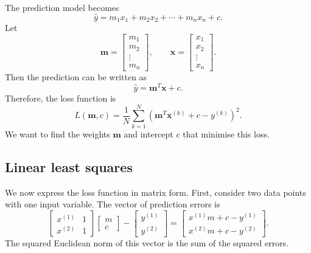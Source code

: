 The prediction model becomes
\[
	\hat{y}=m_1x_1+m_2x_2+\cdots+m_nx_n+c.
\]
Let
\[
	\mathbf{m}=
	\begin{bmatrix}
		m_1 \\m_2\\\vdots\\m_n
	\end{bmatrix},
	\qquad
	\mathbf{x}=
	\begin{bmatrix}
		x_1 \\x_2\\\vdots\\x_n
	\end{bmatrix}.
\]
Then the prediction can be written as
\[
	\hat{y}=\mathbf{m}^T\mathbf{x}+c.
\]
Therefore, the loss function is
\[
	L(\mathbf{m},c)
	=\frac{1}{N}\sum_{k=1}^{N}
	\left(\mathbf{m}^T\mathbf{x}^{(k)}+c-y^{(k)}\right)^2.
\]
We want to find the weights \(\mathbf{m}\) and intercept \(c\) that minimise this loss.

\subsection{Linear least squares}

We now express the loss function in matrix form. First, consider two data points with one input variable. The vector of prediction errors is
\[
	\begin{bmatrix}
		x^{(1)} & 1 \\
		x^{(2)} & 1
	\end{bmatrix}
	\begin{bmatrix}
		m \\c
	\end{bmatrix}
	-
	\begin{bmatrix}
		y^{(1)} \\y^{(2)}
	\end{bmatrix}
	=
	\begin{bmatrix}
		x^{(1)}m+c-y^{(1)} \\
		x^{(2)}m+c-y^{(2)}
	\end{bmatrix}.
\]
The squared Euclidean norm of this vector is the sum of the squared errors.

